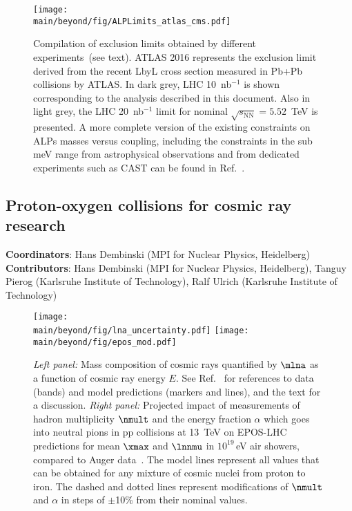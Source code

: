 \documentclass[../report.tex]{subfiles}
\providecommand{\main}{..}
\begin{document}
\begin{figure}[!htbp]
\centering
  \texttt{[image: \\main/beyond/fig/ALPLimits\_atlas\_cms.pdf]}
  \caption{Compilation of exclusion limits obtained by different experiments~(see text).
  ATLAS 2016 represents the exclusion limit derived from the recent LbyL cross section measured in Pb+Pb collisions by ATLAS.
  In dark grey, LHC 10~nb$^{-1}$ is shown corresponding to the analysis described in this document. Also in light grey, the LHC 20~nb$^{-1}$ limit for nominal $\sqrt{s_{\mathrm{NN}}}=5.52$~TeV is presented. A more complete version of the existing constraints on ALPs masses versus coupling, including the
  constraints in the sub meV range from astrophysical observations and
  from dedicated experiments such as CAST can be found in Ref.~\cite{Bauer:2017ris}.}
  \label{fig:alp-lambda-limits}
\end{figure}

\subsection{Proton-oxygen collisions for cosmic ray research}
\label{sec:pOcosmic}
\textbf{Coordinators}: Hans Dembinski (MPI for Nuclear Physics, Heidelberg)
 \textbf{Contributors}: Hans Dembinski (MPI for Nuclear Physics, Heidelberg), Tanguy Pierog (Karlsruhe Institute of Technology), Ralf Ulrich (Karlsruhe Institute of Technology)

\begin{figure}
\texttt{[image: \\main/beyond/fig/lna\_uncertainty.pdf]}
\texttt{[image: \\main/beyond/fig/epos\_mod.pdf]}
\caption{\emph{Left panel:} Mass composition of cosmic rays quantified by $\mlna$ as a function of cosmic ray energy $E$. See Ref.~\cite{kampert_cr_review} for references to data (bands) and model predictions (markers and lines), and the text for a discussion. \emph{Right panel:} Projected impact of measurements of hadron multiplicity $\nmult$ and the energy fraction $\alpha$ which goes into neutral pions in pp collisions at \SI{13}{TeV} on EPOS-LHC predictions for mean $\xmax$ and $\lnnmu$ in $10^{19}$\,\si{eV} air showers, compared to Auger data~\cite{Aab:2014pza}. The model lines represent all values that can be obtained for any mixture of cosmic nuclei from proton to iron. The dashed and dotted lines represent modifications of $\nmult$ and $\alpha$ in steps of $\pm$10\% from their nominal values.}
\label{fig:cosmic_rays}
\end{figure}
\end{document}
